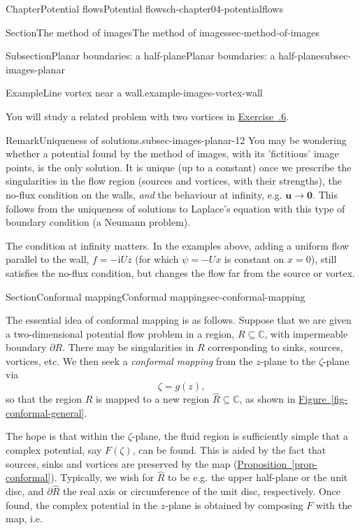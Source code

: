 \documentclass[oneside,10pt,]{book}
\newcommand{\xreffont}{\relax}
\numberwithin{equation}{section}
\newcommand{\im}{\mathrm{i}}
\newcommand{\bu}{\boldsymbol{u}}
\begin{document}
\begin{chapterptx}{Chapter}{Potential flows}{}{Potential flows}{}{}{ch-chapter04-potentialflows}
\begin{sectionptx}{Section}{The method of images}{}{The method of images}{}{}{sec-method-of-images}
\begin{subsectionptx}{Subsection}{Planar boundaries: a half-plane}{}{Planar boundaries: a half-plane}{}{}{subsec-images-planar}
\begin{example}{Example}{Line vortex near a wall.}{example-images-vortex-wall}
\end{example}
You will study a related problem with two vortices in \hyperlink{ex-hw-image-planar03}{Exercise~{\xreffont 4.7.6}}.%
\begin{remark}{Remark}{Uniqueness of solutions.}{subsec-images-planar-12}%
You may be wondering whether a potential found by the method of images, with its 'fictitious' image points, is the only solution. It is unique (up to a constant) once we prescribe the singularities in the flow region (sources and vortices, with their strengths), the no-flux condition on the walls, \emph{and} the behaviour at infinity, e.g. \(\bu \to \mathbf{0}\). This follows from the uniqueness of solutions to Laplace's equation with this type of boundary condition (a Neumann problem).%
\par
The condition at infinity matters. In the examples above, adding a uniform flow parallel to the wall, \(f = -\im Uz\) (for which \(\psi = -Ux\) is constant on \(x = 0\)), still satisfies the no-flux condition, but changes the flow far from the source or vortex.%
\end{remark}
\end{subsectionptx}
\end{sectionptx}
%
%
\typeout{************************************************}
\typeout{************************************************}
%
\begin{sectionptx}{Section}{Conformal mapping}{}{Conformal mapping}{}{}{sec-conformal-mapping}
\begin{introduction}{}%
The essential idea of conformal mapping is as follows. Suppose that we are given a two-dimensional potential flow problem in a region, \(R \subseteq \mathbb{C}\), with impermeable boundary \(\partial R\). There may be singularities in \(R\) corresponding to sinks, sources, vortices, etc. We then seek a \emph{conformal mapping} from the \(z\)-plane to the \(\zeta\)-plane via%
\begin{equation*}
\zeta = g(z),
\end{equation*}
so that the region \(R\) is mapped to a new region \(\hat{R} \subseteq \mathbb{C}\), as shown in \hyperref[fig-conformal-general]{Figure~{\xreffont\ref{fig-conformal-general}}}.%
\par
The hope is that within the \(\zeta\)-plane, the fluid region is sufficiently simple that a complex potential, say \(F(\zeta)\), can be found. This is aided by the fact that sources, sinks and vortices are preserved by the map (\hyperref[prop-conformal]{Proposition~{\xreffont\ref{prop-conformal}}}). Typically, we wish for \(\hat{R}\) to be e.g. the upper half-plane or the unit disc, and \(\partial\hat{R}\) the real axis or circumference of the unit disc, respectively. Once found, the complex potential in the \(z\)-plane is obtained by composing \(F\) with the map, i.e.%

\end{introduction}
\end{sectionptx}
\end{chapterptx}
\end{document}

